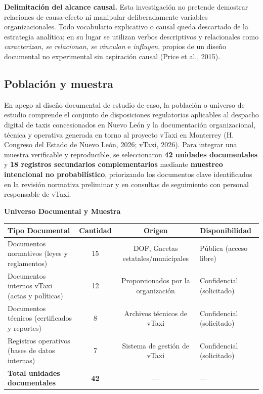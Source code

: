 {\textbf{Delimitación del alcance causal.} Esta investigación no pretende demostrar relaciones de causa-efecto ni manipular deliberadamente variables organizacionales. Todo vocabulario explicativo o causal queda descartado de la estrategia analítica; en su lugar se utilizan verbos descriptivos y relacionales como \textit{caracterizan}, \textit{se relacionan}, \textit{se vinculan} e \textit{influyen}, propios de un diseño documental no experimental sin aspiración causal (Price et al., 2015).

\subsection{Población y muestra}
En apego al diseño documental de estudio de caso, la población o universo de estudio comprende el conjunto de disposiciones regulatorias aplicables al despacho digital de taxis concesionados en Nuevo León y la documentación organizacional, técnica y operativa generada en torno al proyecto vTaxi en Monterrey (H. Congreso del Estado de Nuevo León, 2026; vTaxi, 2026). Para integrar una muestra verificable y reproducible, se seleccionaron \textbf{42 unidades documentales} y \textbf{18 registros secundarios complementarios} mediante \textbf{muestreo intencional no probabilístico}, priorizando los documentos clave identificados en la revisión normativa preliminar y en consultas de seguimiento con personal responsable de vTaxi.

\begin{center}
\textbf{Universo Documental y Muestra}\par\vspace{1mm}
\begingroup\small
\renewcommand{\arraystretch}{1.25}
\setlength{\tabcolsep}{5pt}
\begin{tabular}{@{}p{4.8cm}ccp{4.2cm}@{}}
\toprule
\textbf{Tipo Documental} & \textbf{Cantidad} & \textbf{Origen} & \textbf{Disponibilidad} \\
\midrule
Documentos normativos (leyes y reglamentos) & 15 & DOF, Gacetas estatales/municipales & Pública (acceso libre) \\
Documentos internos vTaxi (actas y políticas) & 12 & Proporcionados por la organización & Confidencial (solicitado) \\
Documentos técnicos (certificados y reportes) & 8 & Archivos técnicos de vTaxi & Confidencial (solicitado) \\
Registros operativos (bases de datos internas) & 7 & Sistema de gestión de vTaxi & Confidencial (solicitado) \\
\midrule
\textbf{Total unidades documentales} & \textbf{42} & — & — \\
\bottomrule
\end{tabular}
\endgroup
\end{center}

}
